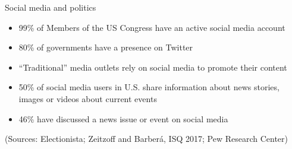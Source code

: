 \documentclass{beamer}
\begin{document}
\begin{frame}
	Social media and politics
	\begin{itemize}[<+->]
		\item 99\% of Members of the US Congress have an active social media account
		\item 80\% of governments have a presence on Twitter
		\item ``Traditional'' media outlets rely on social media to promote their content
		\item 50\% of social media users in U.S. share information about news stories, images or videos about current events
		\item 46\% have discussed a news issue or event on social media
	\end{itemize}
	
	\vfill
	\hfill\tiny{(Sources: Electionista; Zeitzoff and Barber\'{a}, ISQ 2017; Pew Research Center)}
	
\end{frame}
\end{document}
